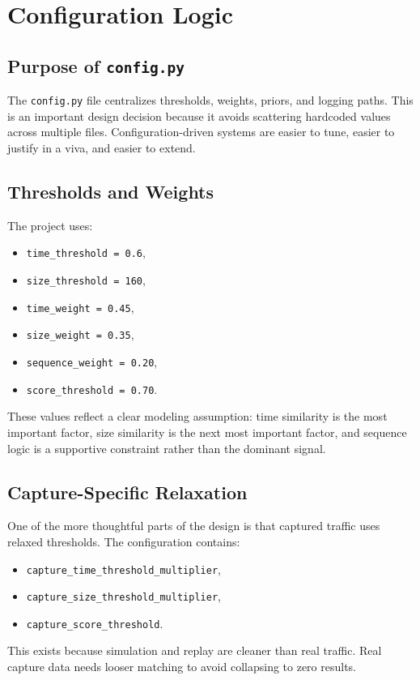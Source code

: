 \documentclass[12pt,a4paper]{report}
\begin{document}
\chapter{Configuration Logic}
\section{Purpose of \texttt{config.py}}
The \texttt{config.py} file centralizes thresholds, weights, priors, and logging paths. This is an important design decision because it avoids scattering hardcoded values across multiple files. Configuration-driven systems are easier to tune, easier to justify in a viva, and easier to extend.

\section{Thresholds and Weights}
The project uses:
\begin{itemize}[leftmargin=1.5em]
    \item \texttt{time\_threshold = 0.6},
    \item \texttt{size\_threshold = 160},
    \item \texttt{time\_weight = 0.45},
    \item \texttt{size\_weight = 0.35},
    \item \texttt{sequence\_weight = 0.20},
    \item \texttt{score\_threshold = 0.70}.
\end{itemize}

These values reflect a clear modeling assumption: time similarity is the most important factor, size similarity is the next most important factor, and sequence logic is a supportive constraint rather than the dominant signal.

\section{Capture-Specific Relaxation}
One of the more thoughtful parts of the design is that captured traffic uses relaxed thresholds. The configuration contains:
\begin{itemize}[leftmargin=1.5em]
    \item \texttt{capture\_time\_threshold\_multiplier},
    \item \texttt{capture\_size\_threshold\_multiplier},
    \item \texttt{capture\_score\_threshold}.
\end{itemize}
This exists because simulation and replay are cleaner than real traffic. Real capture data needs looser matching to avoid collapsing to zero results.
\end{document}
